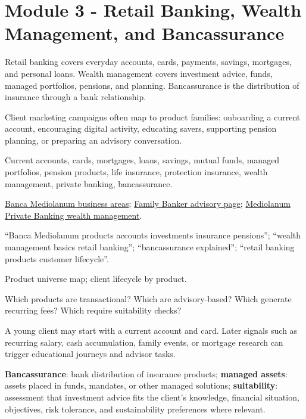 \documentclass[
	11pt,
	fleqn,
	a4paper,
	oneside,
]{LegrandOrangeBook}
\newcommand{\moduleblock}[9]{%
	\begin{description}[leftmargin=3.4cm, style=nextline, font=\sffamily\bfseries]
		\item[What it is] #1
		\item[Why it matters] #2
		\item[Key concepts] #3
		\item[Resources to find] #4
		\item[Search queries] #5
		\item[Diagrams] #6
		\item[Practical questions] #7
		\item[Mini case] #8
		\item[Key terms] #9
	\end{description}
}
\newcommand{\source}[2]{\href{#2}{#1}}
\newcommand{\term}[2]{\textbf{#1}: #2}
\begin{document}
\section{Module 3 - Retail Banking, Wealth Management, and Bancassurance}

\moduleblock
{Retail banking covers everyday accounts, cards, payments, savings, mortgages, and personal loans. Wealth management covers investment advice, funds, managed portfolios, pensions, and planning. Bancassurance is the distribution of insurance through a bank relationship.}
{Client marketing campaigns often map to product families: onboarding a current account, encouraging digital activity, educating savers, supporting pension planning, or preparing an advisory conversation.}
{Current accounts, cards, mortgages, loans, savings, mutual funds, managed portfolios, pension products, life insurance, protection insurance, wealth management, private banking, bancassurance.}
{\source{Banca Mediolanum business areas}{https://www.bancamediolanum.it/aree-di-business}; \source{Family Banker advisory page}{https://www.familybanker.it/consulenza}; \source{Mediolanum Private Banking wealth management}{https://www.mediolanumprivatebanking.it/i-nostri-servizi/wealth-management}.}
{``Banca Mediolanum products accounts investments insurance pensions''; ``wealth management basics retail banking''; ``bancassurance explained''; ``retail banking products customer lifecycle''.}
{Product universe map; client lifecycle by product.}
{Which products are transactional? Which are advisory-based? Which generate recurring fees? Which require suitability checks?}
{A young client may start with a current account and card. Later signals such as recurring salary, cash accumulation, family events, or mortgage research can trigger educational journeys and advisor tasks.}
{\term{Bancassurance}{bank distribution of insurance products}; \term{managed assets}{assets placed in funds, mandates, or other managed solutions}; \term{suitability}{assessment that investment advice fits the client's knowledge, financial situation, objectives, risk tolerance, and sustainability preferences where relevant}.}
\end{document}
